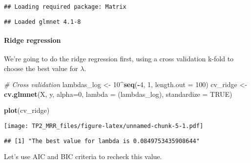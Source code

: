 \documentclass[
]{article}
\newenvironment{Shaded}{\begin{snugshade}}{\end{snugshade}}
\newcommand{\AttributeTok}[1]{\textcolor[rgb]{0.13,0.29,0.53}{#1}}
\newcommand{\CommentTok}[1]{\textcolor[rgb]{0.56,0.35,0.01}{\textit{#1}}}
\newcommand{\ConstantTok}[1]{\textcolor[rgb]{0.56,0.35,0.01}{#1}}
\newcommand{\DecValTok}[1]{\textcolor[rgb]{0.00,0.00,0.81}{#1}}
\newcommand{\FunctionTok}[1]{\textcolor[rgb]{0.13,0.29,0.53}{\textbf{#1}}}
\newcommand{\NormalTok}[1]{#1}
\newcommand{\OtherTok}[1]{\textcolor[rgb]{0.56,0.35,0.01}{#1}}
\newcommand{\SpecialCharTok}[1]{\textcolor[rgb]{0.81,0.36,0.00}{\textbf{#1}}}
\newcommand{\StringTok}[1]{\textcolor[rgb]{0.31,0.60,0.02}{#1}}
\begin{document}
\begin{verbatim}
## Loading required package: Matrix
\end{verbatim}

\begin{verbatim}
## Loaded glmnet 4.1-8
\end{verbatim}

\paragraph{Ridge regression}\label{ridge-regression}

We're going to do the ridge regression first, using a cross validation
k-fold to choose the best value for \(\lambda\).

\begin{Shaded}
\begin{Highlighting}[]
\CommentTok{\# Cross validation}
\NormalTok{lambdas\_log }\OtherTok{\textless{}{-}} \DecValTok{10}\SpecialCharTok{\^{}}\FunctionTok{seq}\NormalTok{(}\SpecialCharTok{{-}}\DecValTok{4}\NormalTok{, }\DecValTok{1}\NormalTok{, }\AttributeTok{length.out =} \DecValTok{100}\NormalTok{)}
\NormalTok{cv\_ridge }\OtherTok{\textless{}{-}} \FunctionTok{cv.glmnet}\NormalTok{(X, y, }\AttributeTok{alpha=}\DecValTok{0}\NormalTok{, }\AttributeTok{lambda =}\NormalTok{ (lambdas\_log), }\AttributeTok{standardize =} \ConstantTok{TRUE}\NormalTok{)}

\FunctionTok{plot}\NormalTok{(cv\_ridge)}
\end{Highlighting}
\end{Shaded}

\texttt{[image: TP2\_MRR\_files/figure-latex/unnamed-chunk-5-1.pdf]}

\begin{Shaded}
\end{Shaded}

\begin{verbatim}
## [1] "The best value for lambda is 0.0849753435908644"
\end{verbatim}

Let's use AIC and BIC criteria to recheck this value.
\end{document}

